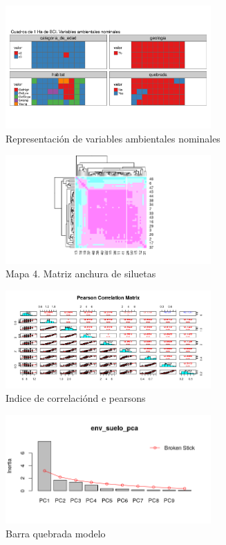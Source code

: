\documentclass[11pt,]{article}
\begin{document}
\begin{figure}
\centering
\includegraphics[width=0.70000\textwidth]{mapas_variables_ambientales_nominales_tmap.png}
\caption{Representación de variables ambientales nominales}
\end{figure}

\begin{figure}
\centering
\includegraphics[width=0.70000\textwidth]{anchura_siluetas_matriz.png}
\caption{Mapa 4. Matriz anchura de siluetas}
\end{figure}

\begin{figure}
\centering
\includegraphics[width=0.70000\textwidth]{Indice_correlacion_Pearson.png}
\caption{Indice de correlaciónd e
pearsons\label{fig:matriz_disimilaridad}}
\end{figure}

\begin{figure}
\centering
\includegraphics[width=0.70000\textwidth]{modelo_barra_quebrada.png}
\caption{Barra quebrada modelo}
\end{figure}
\end{document}
